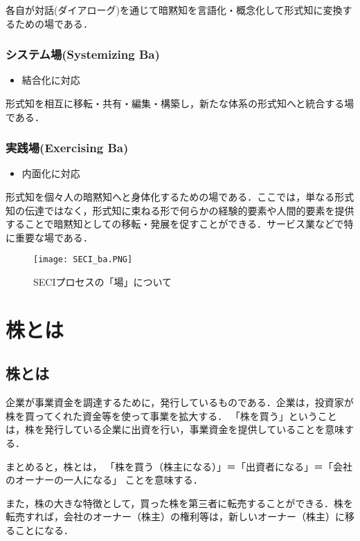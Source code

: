 各自が対話(ダイアローグ)を通じて暗黙知を言語化・概念化して形式知に変換するための場である\cite{ba}．

\subsection{システム場(Systemizing Ba)}
\begin{itemize}
  \item 結合化に対応
\end{itemize}

形式知を相互に移転・共有・編集・構築し，新たな体系の形式知へと統合する場である\cite{ba}．

\subsection{実践場(Exercising Ba)}
\begin{itemize}
  \item 内面化に対応
\end{itemize}

形式知を個々人の暗黙知へと身体化するための場である．ここでは，単なる形式知の伝達ではなく，形式知に束ねる形で何らかの経験的要素や人間的要素を提供することで暗黙知としての移転・発展を促すことができる．サービス業などで特に重要な場である\cite{ba}．

\begin{figure}[H]
\centering
\texttt{[image: SECI\_ba.PNG]}
\caption{SECIプロセスの「場」について}\label{サンプル図}
\end{figure}

\chapter{株とは}
\section{株とは}
企業が事業資金を調達するために，発行しているものである．企業は，投資家が株を買ってくれた資金等を使って事業を拡大する．
「株を買う」ということは，株を発行している企業に出資を行い，事業資金を提供していることを意味する．

まとめると，株とは，
「株を買う（株主になる）」＝「出資者になる」＝「会社のオーナーの一人になる」
ことを意味する\cite{kaisya}．

また，株の大きな特徴として，買った株を第三者に転売することができる．株を転売すれば，会社のオーナー（株主）の権利等は，新しいオーナー（株主）に移ることになる\cite{kabu}．

